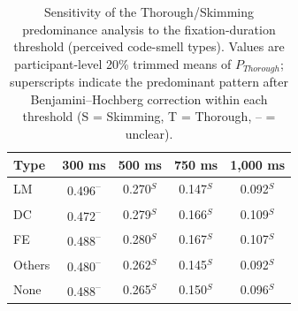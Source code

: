 \begin{table}[ht]
\centering
\caption{Sensitivity of the Thorough/Skimming predominance analysis to the
fixation-duration threshold (perceived code-smell types). Values are participant-level 20\% trimmed
means of $P_{Thorough}$; superscripts indicate the predominant pattern
after Benjamini--Hochberg correction within each threshold
(S = Skimming, T = Thorough, -- = unclear).}
\label{tab:thorough_threshold_sensitivity}
\begin{tabular}{lcccc}
\toprule
Type & 300 ms & 500 ms & 750 ms & 1,000 ms \\
\midrule
LM     & 0.496\textsuperscript{--} & 0.270$^{S}$ & 0.147$^{S}$ & 0.092$^{S}$ \\
DC     & 0.472\textsuperscript{--} & 0.279$^{S}$ & 0.166$^{S}$ & 0.109$^{S}$ \\
FE     & 0.488\textsuperscript{--} & 0.280$^{S}$ & 0.167$^{S}$ & 0.107$^{S}$ \\
Others & 0.480\textsuperscript{--} & 0.262$^{S}$ & 0.145$^{S}$ & 0.092$^{S}$ \\
None   & 0.488\textsuperscript{--} & 0.265$^{S}$ & 0.150$^{S}$ & 0.096$^{S}$ \\
\bottomrule
\end{tabular}
\end{table}
